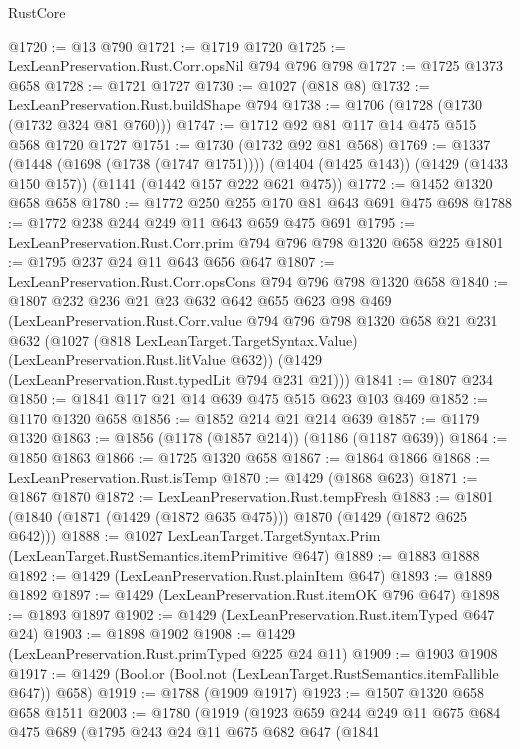 \begin{lexlean}{RustCore}
\begin{coremodule}
@1720 := @13 @790
@1721 := @1719 @1720
@1725 := LexLeanPreservation.Rust.Corr.opsNil @794 @796 @798
@1727 := @1725 @1373 @658
@1728 := @1721 @1727
@1730 := @1027 (@818 @8)
@1732 := LexLeanPreservation.Rust.buildShape @794
@1738 := @1706 (@1728 (@1730 (@1732 @324 @81 @760)))
@1747 := @1712 @92 @81 @117 @14 @475 @515 @568 @1720 @1727
@1751 := @1730 (@1732 @92 @81 @568)
@1769 := @1337
    (@1448 (@1698 (@1738 (@1747 @1751))))
    (@1404 (@1425 @143))
    (@1429 (@1433 @150 @157))
    (@1141 (@1442 @157 @222 @621 @475))
@1772 := @1452 @1320 @658 @658
@1780 := @1772 @250 @255 @170 @81 @643 @691 @475 @698
@1788 := @1772 @238 @244 @249 @11 @643 @659 @475 @691
@1795 := LexLeanPreservation.Rust.Corr.prim @794 @796 @798 @1320 @658 @225
@1801 := @1795 @237 @24 @11 @643 @656 @647
@1807 := LexLeanPreservation.Rust.Corr.opsCons @794 @796 @798 @1320 @658
@1840 := @1807
    @232
    @236
    @21
    @23
    @632
    @642
    @655
    @623
    @98
    @469
    (LexLeanPreservation.Rust.Corr.value
      @794
      @796
      @798
      @1320
      @658
      @21
      @231
      @632
      (@1027 (@818 LexLeanTarget.TargetSyntax.Value) (LexLeanPreservation.Rust.litValue @632))
      (@1429 (LexLeanPreservation.Rust.typedLit @794 @231 @21)))
@1841 := @1807 @234
@1850 := @1841 @117 @21 @14 @639 @475 @515 @623 @103 @469
@1852 := @1170 @1320 @658
@1856 := @1852 @214 @21 @214 @639
@1857 := @1179 @1320
@1863 := @1856 (@1178 (@1857 @214)) (@1186 (@1187 @639))
@1864 := @1850 @1863
@1866 := @1725 @1320 @658
@1867 := @1864 @1866
@1868 := LexLeanPreservation.Rust.isTemp
@1870 := @1429 (@1868 @623)
@1871 := @1867 @1870
@1872 := LexLeanPreservation.Rust.tempFresh
@1883 := @1801 (@1840 (@1871 (@1429 (@1872 @635 @475))) @1870 (@1429 (@1872 @625 @642)))
@1888 := @1027 LexLeanTarget.TargetSyntax.Prim (LexLeanTarget.RustSemantics.itemPrimitive @647)
@1889 := @1883 @1888
@1892 := @1429 (LexLeanPreservation.Rust.plainItem @647)
@1893 := @1889 @1892
@1897 := @1429 (LexLeanPreservation.Rust.itemOK @796 @647)
@1898 := @1893 @1897
@1902 := @1429 (LexLeanPreservation.Rust.itemTyped @647 @24)
@1903 := @1898 @1902
@1908 := @1429 (LexLeanPreservation.Rust.primTyped @225 @24 @11)
@1909 := @1903 @1908
@1917 := @1429 (Bool.or (Bool.not (LexLeanTarget.RustSemantics.itemFallible @647)) @658)
@1919 := @1788 (@1909 @1917)
@1923 := @1507 @1320 @658 @658 @1511
@2003 := @1780
    (@1919
      (@1923
        @659
        @244
        @249
        @11
        @675
        @684
        @475
        @689
        (@1795
          @243
          @24
          @11
          @675
          @682
          @647
          (@1841

\end{coremodule}
\end{lexlean}
